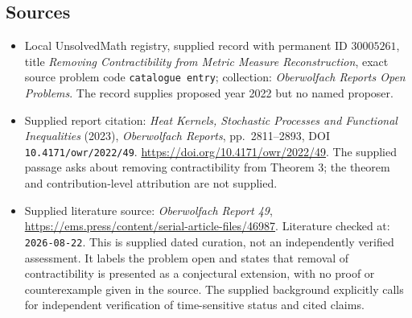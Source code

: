 \documentclass[11pt]{article}
\begin{document}
\subsection{Sources}
\begin{itemize}
\item Local UnsolvedMath registry, supplied record with permanent ID \(30005261\), title \emph{Removing Contractibility from Metric Measure Reconstruction}, exact source problem code \texttt{catalogue entry}; collection: \emph{Oberwolfach Reports Open Problems}. The record supplies proposed year 2022 but no named proposer.
\item Supplied report citation: \emph{Heat Kernels, Stochastic Processes and Functional Inequalities} (2023), \emph{Oberwolfach Reports}, pp.~2811--2893, DOI \texttt{10.4171/owr/2022/49}. \url{https://doi.org/10.4171/owr/2022/49}. The supplied passage asks about removing contractibility from Theorem 3; the theorem and contribution-level attribution are not supplied.
\item Supplied literature source: \emph{Oberwolfach Report 49}, \url{https://ems.press/content/serial-article-files/46987}. Literature checked at: \texttt{2026-08-22}. This is supplied dated curation, not an independently verified assessment. It labels the problem open and states that removal of contractibility is presented as a conjectural extension, with no proof or counterexample given in the source. The supplied background explicitly calls for independent verification of time-sensitive status and cited claims.
\end{itemize}
\end{document}
